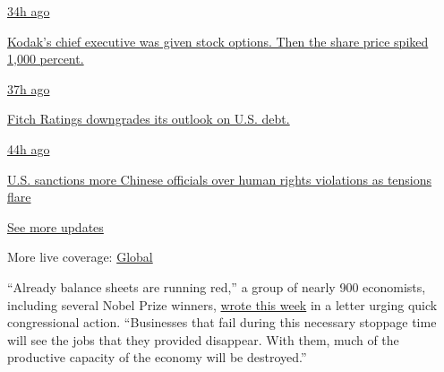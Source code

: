 \href{https://www.nytimes.com/live/2020/07/31/business/stock-market-today-coronavirus?action=click\&pgtype=Article\&state=default\&region=MAIN_CONTENT_1\&context=storylines_live_updates\#kodaks-chief-executive-was-given-stock-options-then-the-share-price-spiked-1000-percent}{34h
ago}

\href{https://www.nytimes.com/live/2020/07/31/business/stock-market-today-coronavirus?action=click\&pgtype=Article\&state=default\&region=MAIN_CONTENT_1\&context=storylines_live_updates\#kodaks-chief-executive-was-given-stock-options-then-the-share-price-spiked-1000-percent}{Kodak's
chief executive was given stock options. Then the share price spiked
1,000 percent.}

\href{https://www.nytimes.com/live/2020/07/31/business/stock-market-today-coronavirus?action=click\&pgtype=Article\&state=default\&region=MAIN_CONTENT_1\&context=storylines_live_updates\#fitch-ratings-downgrades-its-outlook-on-us-debt}{37h
ago}

\href{https://www.nytimes.com/live/2020/07/31/business/stock-market-today-coronavirus?action=click\&pgtype=Article\&state=default\&region=MAIN_CONTENT_1\&context=storylines_live_updates\#fitch-ratings-downgrades-its-outlook-on-us-debt}{Fitch
Ratings downgrades its outlook on U.S. debt.}

\href{https://www.nytimes.com/live/2020/07/31/business/stock-market-today-coronavirus?action=click\&pgtype=Article\&state=default\&region=MAIN_CONTENT_1\&context=storylines_live_updates\#us-sanctions-more-chinese-officials-over-human-rights-violations-as-tensions-flare}{44h
ago}

\href{https://www.nytimes.com/live/2020/07/31/business/stock-market-today-coronavirus?action=click\&pgtype=Article\&state=default\&region=MAIN_CONTENT_1\&context=storylines_live_updates\#us-sanctions-more-chinese-officials-over-human-rights-violations-as-tensions-flare}{U.S.
sanctions more Chinese officials over human rights violations as
tensions flare}

\href{https://www.nytimes.com/live/2020/07/31/business/stock-market-today-coronavirus?action=click\&pgtype=Article\&state=default\&region=MAIN_CONTENT_1\&context=storylines_live_updates}{See
more updates}

More live coverage:
\href{https://www.nytimes.com/2020/08/01/world/coronavirus-covid-19.html?action=click\&pgtype=Article\&state=default\&region=MAIN_CONTENT_1\&context=storylines_live_updates}{Global}

``Already balance sheets are running red,'' a group of nearly 900
economists, including several Nobel Prize winners,
\href{http://www.columbia.edu/~wk2110/Corona/Statement.html}{wrote this
week} in a letter urging quick congressional action. ``Businesses that
fail during this necessary stoppage time will see the jobs that they
provided disappear. With them, much of the productive capacity of the
economy will be destroyed.''

